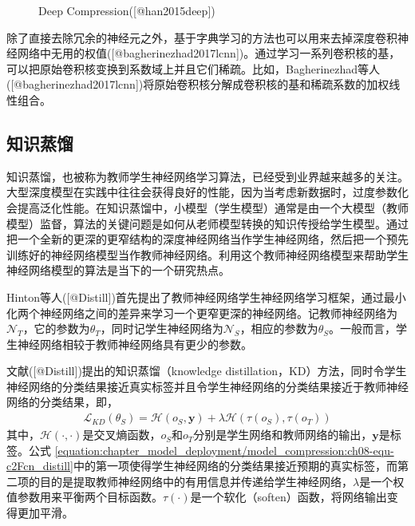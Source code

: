 \documentclass[letterpaper,10pt,english]{sphinxmanual}
\let\sphinxpxdimen\pdfpxdimen\else\newdimen\sphinxpxdimen
\begin{document}
\begin{figure}[H]
\centering
\capstart

\noindent\sphinxincludegraphics[width=800\sphinxpxdimen]{{deepcomp}.png}
\caption{Deep Compression({[}@han2015deep{]})}\label{\detokenize{chapter_model_deployment/model_compression:id11}}\label{\detokenize{chapter_model_deployment/model_compression:ch08-fig-deepcomp}}\end{figure}

\sphinxAtStartPar
除了直接去除冗余的神经元之外，基于字典学习的方法也可以用来去掉深度卷积神经网络中无用的权值({[}@bagherinezhad2017lcnn{]})。通过学习一系列卷积核的基，可以把原始卷积核变换到系数域上并且它们稀疏。比如，Bagherinezhad等人({[}@bagherinezhad2017lcnn{]})将原始卷积核分解成卷积核的基和稀疏系数的加权线性组合。


\subsection{知识蒸馏}
\label{\detokenize{chapter_model_deployment/model_compression:id9}}
\sphinxAtStartPar
知识蒸馏，也被称为教师\sphinxhyphen{}学生神经网络学习算法，已经受到业界越来越多的关注。大型深度模型在实践中往往会获得良好的性能，因为当考虑新数据时，过度参数化会提高泛化性能。在知识蒸馏中，小模型（学生模型）通常是由一个大模型（教师模型）监督，算法的关键问题是如何从老师模型转换的知识传授给学生模型。通过把一个全新的更深的更窄结构的深度神经网络当作学生神经网络，然后把一个预先训练好的神经网络模型当作教师神经网络。利用这个教师神经网络模型来帮助学生神经网络模型的算法是当下的一个研究热点。

\sphinxAtStartPar
Hinton等人({[}@Distill{]})首先提出了教师神经网络\sphinxhyphen{}学生神经网络学习框架，通过最小化两个神经网络之间的差异来学习一个更窄更深的神经网络。记教师神经网络为\(\mathcal{N}_{T}\)，它的参数为\(\theta_T\)，同时记学生神经网络为\(\mathcal{N}_{S}\)，相应的参数为\(\theta_S\)。一般而言，学生神经网络相较于教师神经网络具有更少的参数。

\sphinxAtStartPar
文献({[}@Distill{]})提出的知识蒸馏（knowledge
distillation，KD）方法，同时令学生神经网络的分类结果接近真实标签并且令学生神经网络的分类结果接近于教师神经网络的分类结果，即，
\begin{equation}\label{equation:chapter_model_deployment/model_compression:ch08-equ-c2Fcn_distill}
\begin{split}\mathcal{L}_{KD}(\theta_S) = \mathcal{H}(o_S,\mathbf{y}) +\lambda\mathcal{H}(\tau(o_S),\tau(o_T))\end{split}
\end{equation}
\sphinxAtStartPar
其中，\(\mathcal{H}(\cdot,\cdot)\)是交叉熵函数，\(o_S\)和\(o_T\)分别是学生网络和教师网络的输出，\(\mathbf{y}\)是标签。公式
\eqref{equation:chapter_model_deployment/model_compression:ch08-equ-c2Fcn_distill}中的第一项使得学生神经网络的分类结果接近预期的真实标签，而第二项的目的是提取教师神经网络中的有用信息并传递给学生神经网络，\(\lambda\)是一个权值参数用来平衡两个目标函数。\(\tau(\cdot)\)是一个软化（soften）函数，将网络输出变得更加平滑。
\end{document}
